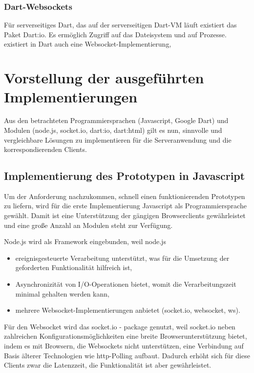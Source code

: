 \subsection{Dart-Websockets}
Für serverseitiges Dart, das auf der serverseitigen Dart-VM läuft existiert das Paket Dart:io. Es ermöglich Zugriff auf das Dateisystem und auf Prozesse.
   existiert in Dart auch eine Websocket-Implementierung,

\chapter{Vorstellung der ausgeführten Implementierungen}\label{s.Implementierungen}

Aus den betrachteten Programmiersprachen (Javascript, Google Dart) und Modulen (node.js, socket.io, dart:io, dart:html) gilt es nun, sinnvolle und vergleichbare Lösungen zu implementieren für die Serveranwendung und die korrespondierenden Clients.

\section{Implementierung des Prototypen in Javascript}
Um der Anforderung nachzukommen, schnell einen funktionierenden Prototypen zu liefern, wird für die erste Implementierung Javascript als Programmiersprache gewählt. Damit ist eine Unterstützung der gängigen Browserclients gewährleistet und eine große Anzahl an Modulen steht zur Verfügung.

Node.js wird als Framework eingebunden, weil node.js 
\begin{itemize}
\item ereignisgesteuerte Verarbeitung unterstützt, was für die Umsetzung der geforderten Funktionalität hilfreich ist,
\item Asynchronizität von I/O-Operationen bietet, womit die Verarbeitungszeit minimal gehalten werden kann,
\item mehrere Websocket-Implementierungen anbietet (socket.io, websocket, ws).
\end{itemize}
Für den Websocket wird das socket.io - package genutzt, weil socket.io neben zahlreichen Konfigurationsmöglichkeiten eine breite Browserunterstützung bietet, indem es mit Browsern, die Websockets nicht unterstützen, eine Verbindung auf Basis  älterer Technologien wie http-Polling aufbaut. Dadurch erhöht sich für diese Clients zwar die Latenzzeit, die Funktionalität ist aber gewährleistet.

